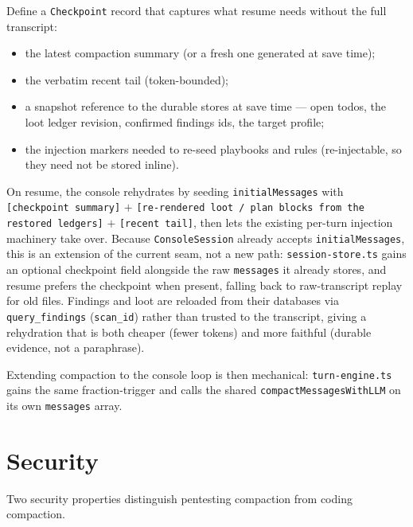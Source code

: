 \documentclass[11pt]{article}
\begin{document}
Define a \texttt{Checkpoint} record that captures what resume needs without the
full transcript:
\begin{itemize}[leftmargin=1.4em]
\item the latest compaction summary (or a fresh one generated at save time);
\item the verbatim recent tail (token-bounded);
\item a snapshot reference to the durable stores at save time --- open todos, the
loot ledger revision, confirmed findings ids, the target profile;
\item the injection markers needed to re-seed playbooks and rules
(re-injectable, so they need not be stored inline).
\end{itemize}
On resume, the console rehydrates by seeding \texttt{initialMessages} with
\texttt{[checkpoint summary]} $+$ \texttt{[re-rendered loot / plan blocks from
the restored ledgers]} $+$ \texttt{[recent tail]}, then lets the existing
per-turn injection machinery take over. Because \texttt{ConsoleSession} already
accepts \texttt{initialMessages}, this is an extension of the current seam, not a
new path: \texttt{session-store.ts} gains an optional checkpoint field alongside
the raw \texttt{messages} it already stores, and resume prefers the checkpoint
when present, falling back to raw-transcript replay for old files. Findings and
loot are reloaded from their databases via \texttt{query\_findings}
(\texttt{scan\_id}) rather than trusted to the transcript, giving a rehydration
that is both cheaper (fewer tokens) and more faithful (durable evidence, not a
paraphrase).

Extending compaction to the console loop is then mechanical: \texttt{turn-engine.ts}
gains the same fraction-trigger and calls the shared
\texttt{compactMessagesWithLLM} on its own \texttt{messages} array.

\section{Security}
\label{sec:security}

Two security properties distinguish pentesting compaction from coding
compaction.
\end{document}
